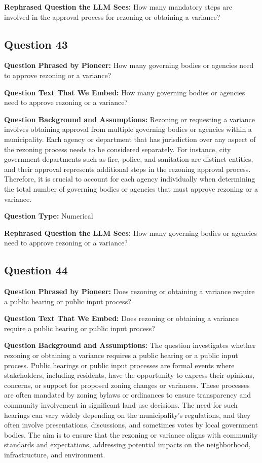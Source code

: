 \noindent\textbf{Rephrased Question the LLM Sees:} How many mandatory steps are involved in the approval process for rezoning or obtaining a variance?

\vspace{1cm}
\subsection*{Question 43}
\noindent\textbf{Question Phrased by Pioneer:} How many governing bodies or agencies need to approve rezoning or a variance?

\noindent\textbf{Question Text That We Embed:} How many governing bodies or agencies need to approve rezoning or a variance?

\noindent\textbf{Question Background and Assumptions:} Rezoning or requesting a variance involves obtaining approval from multiple governing bodies or agencies within a municipality. Each agency or department that has jurisdiction over any aspect of the rezoning process needs to be considered separately. For instance, city government departments such as fire, police, and sanitation are distinct entities, and their approval represents additional steps in the rezoning approval process. Therefore, it is crucial to account for each agency individually when determining the total number of governing bodies or agencies that must approve rezoning or a variance.

\noindent\textbf{Question Type:} Numerical

\noindent\textbf{Rephrased Question the LLM Sees:} How many governing bodies or agencies need to approve rezoning or a variance?

\vspace{1cm}
\subsection*{Question 44}
\noindent\textbf{Question Phrased by Pioneer:} Does rezoning or obtaining a variance require a public hearing or public input process?

\noindent\textbf{Question Text That We Embed:} Does rezoning or obtaining a variance require a public hearing or public input process?

\noindent\textbf{Question Background and Assumptions:} The question investigates whether rezoning or obtaining a variance requires a public hearing or a public input process. Public hearings or public input processes are formal events where stakeholders, including residents, have the opportunity to express their opinions, concerns, or support for proposed zoning changes or variances. These processes are often mandated by zoning bylaws or ordinances to ensure transparency and community involvement in significant land use decisions. The need for such hearings can vary widely depending on the municipality's regulations, and they often involve presentations, discussions, and sometimes votes by local government bodies. The aim is to ensure that the rezoning or variance aligns with community standards and expectations, addressing potential impacts on the neighborhood, infrastructure, and environment.

